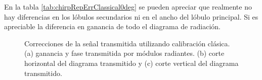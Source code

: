 En la tabla \ref{tab:chirpRepErrClassical0deg} se pueden apreciar que realmente no hay diferencias en los lóbulos secundarios 
ni en el ancho del lóbulo principal. Si es apreciable la diferencia en ganancia de todo el diagrama de radiación.

\begin{figure}[H]
	\centering

	\caption{Correcciones de la señal transmitida utilizando calibración clásica. (a) ganancia y fase transmitida por módulos
		radiantes. (b) corte horizontal del diagrama transmitido y (c) corte vertical del diagrama transmitido.}
	\label{fig:chirpRepErrClassical0deg}
\end{figure}

